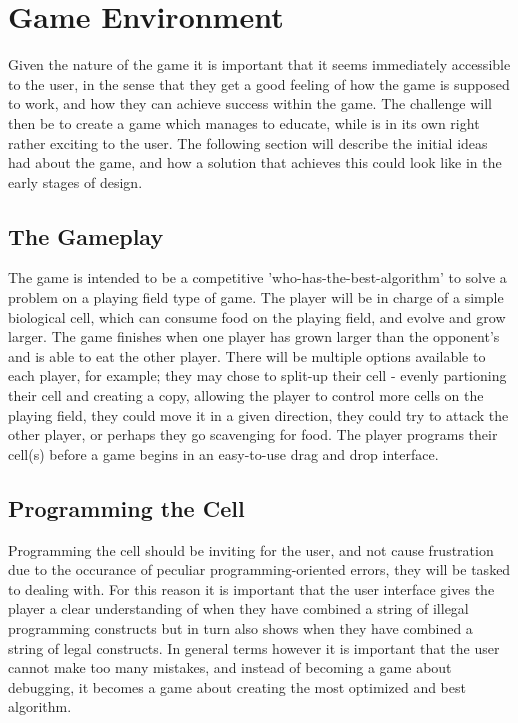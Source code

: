 \section{Game Environment}
\label{Sec: Game Environment}

Given the nature of the game it is important that it seems immediately accessible to the user, in the sense that they get a good feeling of how the game 
is supposed to work, and how they can achieve success within the game. The challenge will then be to create a game  which manages to educate, while is 
in its own right rather exciting to the user. The following section will describe the initial ideas had about the game, and how a solution that 
achieves this could look like in the early stages of design.

\subsection{The Gameplay}

The game is intended to be a competitive 'who-has-the-best-algorithm' to solve a problem on a playing field type of game. The player will be in charge 
of a simple biological cell, which can consume food on the playing field, and evolve and grow larger. The game finishes when one player has grown 
larger than the opponent's and is able to eat the other player. There will be multiple options available to each player, for example; they may chose to 
split-up their cell - evenly partioning their cell and creating a copy, allowing the player to control more cells on the playing field, they could move 
it in a given direction, they could try to attack the other player, or perhaps they go scavenging for food. The player programs their cell(s) before a 
game begins in an easy-to-use drag and drop interface.

\subsection{Programming the Cell}

Programming the cell should be inviting for the user, and not cause frustration due to the occurance of peculiar programming-oriented errors, they will 
be tasked to dealing with. For this reason it is important that the user interface gives the player a clear understanding of when they have combined a 
string of illegal programming constructs but in turn also shows when they have combined a string of legal constructs. In general terms however it is 
important that the user cannot make too many mistakes, and instead of becoming a game about debugging, it becomes a game about creating the most 
optimized and best algorithm.

